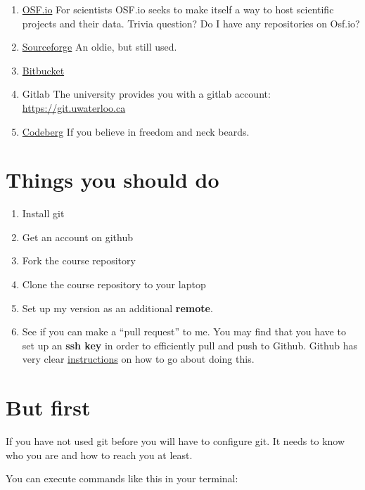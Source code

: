\documentclass[
  letterpaper,
  DIV=11,
  numbers=noendperiod]{scrreprt}
\providecommand{\tightlist}{%
  \setlength{\itemsep}{0pt}\setlength{\parskip}{0pt}}\usepackage{longtable,booktabs,array}
\begin{document}
\begin{enumerate}
\def\labelenumi{\arabic{enumi}.}
\tightlist
\item
  \href{https://osf.io/}{OSF.io} For scientists OSF.io seeks to make
  itself a way to host scientific projects and their data. Trivia
  question? Do I have any repositories on Osf.io?
\item
  \href{https://sourceforge.net/}{Sourceforge} An oldie, but still used.
\item
  \href{https://bitbucket.org/}{Bitbucket}
\item
  Gitlab The university provides you with a gitlab account:
  \url{https://git.uwaterloo.ca}
\item
  \href{https://codeberg.org/}{Codeberg} If you believe in freedom and
  neck beards.
\end{enumerate}

\section{Things you should do}\label{things-you-should-do}

\begin{enumerate}
\def\labelenumi{\arabic{enumi}.}
\tightlist
\item
  Install git
\item
  Get an account on github
\item
  Fork the course repository
\item
  Clone the course repository to your laptop
\item
  Set up my version as an additional \textbf{remote}.
\item
  See if you can make a ``pull request'' to me. You may find that you
  have to set up an \textbf{ssh key} in order to efficiently pull and
  push to Github. Github has very clear
  \href{https://docs.github.com/en/authentication/connecting-to-github-with-ssh/generating-a-new-ssh-key-and-adding-it-to-the-ssh-agent}{instructions}
  on how to go about doing this.
\end{enumerate}

\section{But first}\label{but-first}

If you have not used git before you will have to configure git. It needs
to know who you are and how to reach you at least.

You can execute commands like this in your terminal:
\end{document}
